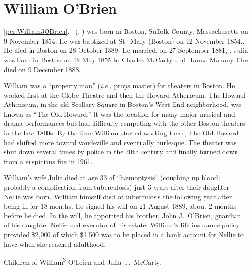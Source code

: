 \section{William O'Brien}

\ref{per:William3OBrien}.\  (, ) was born in Boston, Suffolk County, Massachusetts on 9 November 1854.\cite{William3OBrienBirth} He was baptized at St.\ Mary (Boston) on 12 November 1854.\cite{William3OBrienBaptism}. He died in Boston on 28 October 1889.\cite{William3OBrienDeath} He married, on 27 September 1881, . Julia was born in Boston on 12 May 1855 to Charles McCarty and Hanna Mahony.\cite{JuliaMcCartyBirth} She died on 9 December 1888.\cite{JuliaMcCartyDeath}

William was a ``property man'' (\textit{i.e.,} props master\cite{PropertyMan}) for theaters in Boston. He worked first at the Globe Theatre\cite{WilliamOBrien1880} and then the Howard Athen\ae um.\cite{WilliamOBrien1883} The Howard Athen\ae um, in the old Scollary Square in Boston's West End neighborhood, was known as ``The Old Howard.'' It was the location for many major musical and drama performances but had difficulty competing with the other Boston theaters in the late 1800s. By the time William started working there, The Old Howard had shifted more toward vaudeville and eventually burlesque. The theater was shut down several times by police in the 20th century and finally burned down from a suspicious fire in 1961.\cite{HowardAthenaeum}

William's wife Julia died at age 33 of ``h\ae moptysis'' (coughing up blood; probably a complication from tuberculosis) just 3 years after their daughter Nellie was born.\cite{JuliaMcCartyDeath} William himself died of tuberculosis the following year after being ill for 18 months.\cite{William3OBrienDeath} He signed his will on 21 August 1889, about 2 months before he died. In the will, he appointed his brother, John J.\ O'Brien, guardian of his daughter Nellie and executor of his estate. William's life insurance policy provided \$2,000 of which \$1,500 was to be placed in a bank account for Nellie to have when she reached adulthood.\cite{WilliamOBrienWill}

\begin{KidsIntro}
	Children of William\textsuperscript{3} O'Brien and Julia T.\ McCarty:
\end{KidsIntro}

